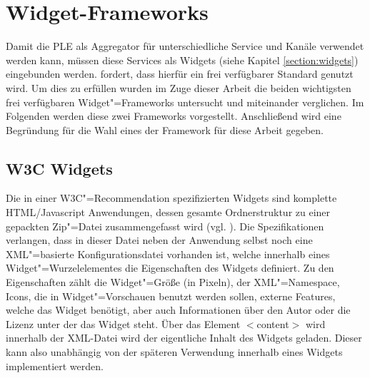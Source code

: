 \section{Widget-Frameworks}\label{section:widget_frameworks}
Damit die PLE als Aggregator für unterschiedliche Service und Kanäle verwendet werden kann, müssen diese Services als Widgets (siehe Kapitel \ref{section:widgets}) eingebunden werden.  fordert, dass hierfür ein frei verfügbarer Standard genutzt wird. Um dies zu erfüllen wurden im Zuge dieser Arbeit die beiden wichtigsten frei verfügbaren Widget"=Frameworks untersucht und miteinander verglichen. Im Folgenden werden diese zwei Frameworks vorgestellt. Anschließend wird eine Begründung für die Wahl eines der Framework für diese Arbeit gegeben.

\subsection{W3C Widgets}\label{section:w3c_widgets}
Die in einer W3C"=Recommendation spezifizierten Widgets sind komplette HTML/Javascript Anwendungen, dessen gesamte Ordnerstruktur zu einer gepackten Zip"=Datei zusammengefasst wird (vgl. \cite{W3C-11-2012}). Die Spezifikationen verlangen, dass in dieser Datei neben der Anwendung selbst noch eine XML"=basierte Konfigurationsdatei vorhanden ist, welche innerhalb eines Widget"=Wurzelelementes die Eigenschaften des Widgets definiert. Zu den Eigenschaften zählt die Widget"=Größe (in Pixeln), der XML"=Namespace, Icons, die in Widget"=Vorschauen benutzt werden sollen, externe Features, welche das Widget benötigt, aber auch Informationen über den Autor oder die Lizenz unter der das Widget steht. Über das Element $<$content$>$ wird innerhalb der XML-Datei wird der eigentliche Inhalt des Widgets geladen. Dieser kann also unabhängig von der späteren Verwendung innerhalb eines Widgets implementiert werden.

